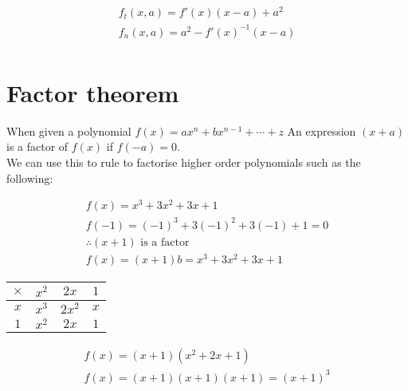 \documentclass{article}
\begin{document}
\begin{gather}
	f_t(x, a) = f'(x)(x-a) + a^2 \\
	f_n(x, a) = a^2 -f'(x)^{-1}(x-a) \\
\end{gather}

\section{Factor theorem}
When given a polynomial $f(x) = ax^n + bx^{n-1} + \cdots + z $
An expression $(x + a)$ is a factor of $f(x)$ if $f(-a) = 0$.
\\
We can use this to rule to factorise higher order polynomials such as the following:

\begin{gather}
	f(x) = x^3 + 3x^2 + 3x + 1 \\
	f(-1) = (-1)^3 + 3(-1)^2 + 3(-1) + 1 = 0\\
	\therefore (x + 1) \text{ is a factor} \\
	f(x) = (x+1)b = x^3 + 3x^2 + 3x + 1
\end{gather}

\begin{center}
	\begin{tabular}{ c | c | c | c }
		$\times$ & $x^2$ & $2x$ & $1$\\ \hline
		$x$ & $x^3$ & $2x^2$ & $x$  \\ \hline
		$1$ & $x^2$ & $2x$ & $1$\\
	\end{tabular}
\end{center}

\begin{gather}
	f(x) = (x+1)(x^2 + 2x + 1) \\
	f(x) = (x+1)(x+1)(x+1) = (x+1)^3
\end{gather}

\enddocument
\end{document}
